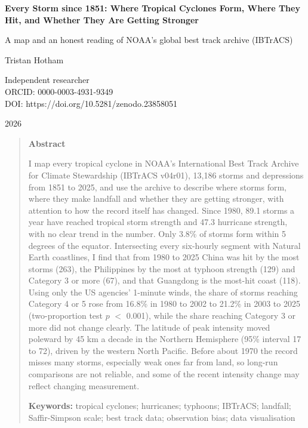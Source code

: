 \documentclass[11pt,a4paper]{article}
\begin{document}
\begin{center}
{\Large\bfseries Every Storm since 1851: Where Tropical Cyclones Form, Where They Hit, and Whether They Are Getting Stronger\par}
\vspace{0.4em}
{\large A map and an honest reading of NOAA's global best track archive (IBTrACS)\par}
\vspace{1.2em}
{\large Tristan Hotham\par}
\vspace{0.3em}
{\small Independent researcher\\
ORCID: 0000-0003-4931-9349\\
DOI: https://doi.org/10.5281/zenodo.23858051\par}
\vspace{0.8em}
2026
\end{center}

\begin{quote}
\small
\begin{center}\textbf{Abstract}\end{center}
I map every tropical cyclone in NOAA's International Best Track Archive for Climate Stewardship (IBTrACS v04r01), 13,186 storms and depressions from 1851 to 2025, and use the archive to describe where storms form, where they make landfall and whether they are getting stronger, with attention to how the record itself has changed. Since 1980, 89.1 storms a year have reached tropical storm strength and 47.3 hurricane strength, with no clear trend in the number. Only 3.8\% of storms form within 5 degrees of the equator. Intersecting every six-hourly segment with Natural Earth coastlines, I find that from 1980 to 2025 China was hit by the most storms (263), the Philippines by the most at typhoon strength (129) and Category 3 or more (67), and that Guangdong is the most-hit coast (118). Using only the US agencies' 1-minute winds, the share of storms reaching Category 4 or 5 rose from 16.8\% in 1980 to 2002 to 21.2\% in 2003 to 2025 (two-proportion test $p$ $<$ 0.001), while the share reaching Category 3 or more did not change clearly. The latitude of peak intensity moved poleward by 45 km a decade in the Northern Hemisphere (95\% interval 17 to 72), driven by the western North Pacific. Before about 1970 the record misses many storms, especially weak ones far from land, so long-run comparisons are not reliable, and some of the recent intensity change may reflect changing measurement.

\textbf{Keywords:} tropical cyclones; hurricanes; typhoons; IBTrACS; landfall; Saffir-Simpson scale; best track data; observation bias; data visualisation
\end{quote}
\end{document}
